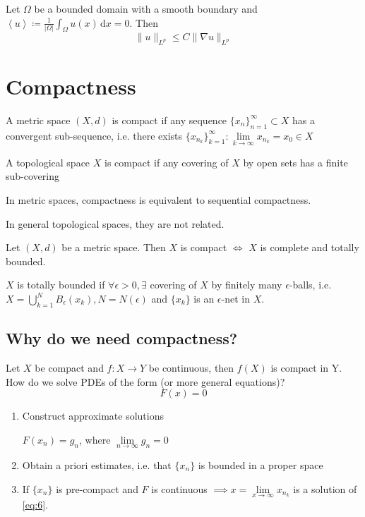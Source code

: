 \documentclass{report}
\begin{document}
{
    Let \(\Omega\) be a bounded domain with a smooth boundary and \(\left\langle u \right\rangle \coloneqq \frac{1}{\vert \Omega \vert } \int_{\Omega} u(x) \,\mathrm{d}x = 0\). Then 
    \[
        \|u\|_{L^{p}} \leq C \|\nabla u\|_{L^{p}}
    \]   
}

\section{Compactness}
{
    A metric space \((X, d)\) is compact if any sequence \(\{x_{n}\}_{n=1}^{\infty} \subset X\) has a convergent sub-sequence, i.e. there exists \(\{x_{n_{k}}\}_{k=1}^{\infty} \colon \lim\limits_{k \to \infty} x_{n_{k}} = x_0 \in X\)
}

\dfn{}
{
    A topological space \(X\) is compact if any covering of \(X\) by open sets has a finite sub-covering
}

\begin{note}
    In metric spaces, compactness is equivalent to sequential compactness.

    In general topological spaces, they are not related.
\end{note}

{
    Let \((X, d)\) be a metric space. Then \(X\) is compact \(\iff\) \(X\) is complete and totally bounded.
}

\dfn{}
{
    \(X\) is totally bounded if \(\forall \epsilon > 0, \exists\) covering of \(X\) by finitely many \(\epsilon\)-balls, i.e. \(X = \bigcup_{k=1}^{N} B_{\epsilon}(x_k), N = N(\epsilon)\) and \(\{x_k\}\) is an \(\epsilon\)-net in \(X\).
}

\subsection{Why do we need compactness?}
Let \(X\) be compact and \(f \colon X \to Y \) be continuous, then \(f(X)\) is compact in Y. How do we solve PDEs of the form (or more general equations)?
\begin{equation}\label{eq:6}
    F(x) = 0
\end{equation}
\begin{enumerate}
    \item Construct approximate solutions
    
    \(F(x_n) = g_n\), where \(\lim\limits_{n \to \infty} g_n = 0\)
    \item Obtain a priori estimates, i.e. that \(\{x_n\}\) is bounded in a proper space
    \item If \(\{x_n\}\) is pre-compact and \(F\) is continuous \(\implies x = \lim\limits_{x \to \infty} x_{n_{k}}\) is a solution of \ref{eq:6}.
\end{enumerate}
\end{document}
